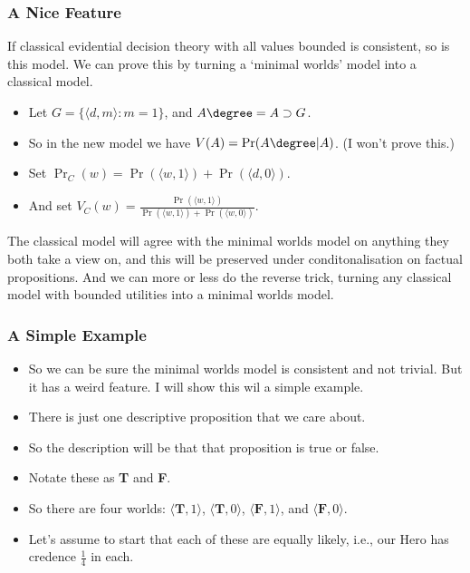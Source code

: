\begin{frame}[fragile]
\frametitle{A Nice Feature}
\label{anicefeature}

If classical evidential decision theory with all values bounded is consistent, so is this model. We can prove this by turning a `minimal worlds' model into a classical model.

\begin{itemize}
\item{} Let $G = \{\langle d, m\rangle: m = 1\}$, and $A\degree = A \supset G$.

\item{} So in the new model we have $V(A) = \Pr(A\degree | A)$. (I won't prove this.)

\item{} Set $\Pr_C(w) = \Pr(\langle w, 1\rangle) + \Pr(\langle d, 0\rangle)$.

\item{} And set $V_C(w) = \frac{\Pr(\langle w, 1\rangle)}{\Pr(\langle w, 1\rangle)+\Pr(\langle w,0\rangle)}$.

\end{itemize}

The classical model will agree with the minimal worlds model on anything they both take a view on, and this will be preserved under conditonalisation on factual propositions. And we can more or less do the reverse trick, turning any classical model with bounded utilities into a minimal worlds model.

\end{frame}

\begin{frame}[fragile]
\frametitle{A Simple Example}
\label{asimpleexample}

\begin{itemize}
\item{} So we can be sure the minimal worlds model is consistent and not trivial. But it has a weird feature. I will show this wil a simple example. \pause 

\item{}  There is just one descriptive proposition that we care about.

\item{} So the description will be that that proposition is true or false.

\item{} Notate these as \textbf{T} and \textbf{F}.

\item{} So there are four worlds: $\langle \textbf{T}, 1 \rangle$, $\langle \textbf{T}, 0 \rangle$, $\langle \textbf{F}, 1 \rangle$, and $\langle \textbf{F}, 0 \rangle$.

\item{} Let's assume to start that each of these are equally likely, i.e., our Hero has credence $\frac{1}{4}$ in each.

\end{itemize}

\end{frame}

